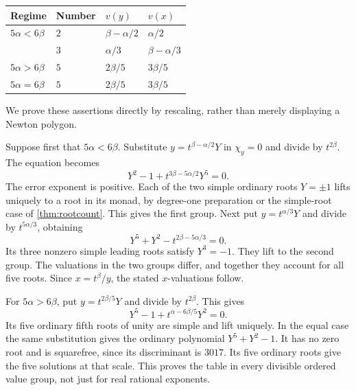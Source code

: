 \documentclass[11pt]{article}
\theoremstyle{definition}
\begin{document}
\begin{center}
\begin{tabular}{@{}L{0.23\textwidth}L{0.12\textwidth}L{0.23\textwidth}L{0.23\textwidth}@{}}
\toprule
Regime & Number & $v(y)$ & $v(x)$\\
\midrule
$5\alpha<6\beta$ & $2$ & $\beta-\alpha/2$ & $\alpha/2$\\[0.3em]
 & $3$ & $\alpha/3$ & $\beta-\alpha/3$\\[0.3em]
$5\alpha>6\beta$ & $5$ & $2\beta/5$ & $3\beta/5$\\[0.3em]
$5\alpha=6\beta$ & $5$ & $2\beta/5$ & $3\beta/5$\\
\bottomrule
\end{tabular}
\end{center}
We prove these assertions directly by rescaling, rather than merely displaying a Newton polygon.

Suppose first that $5\alpha<6\beta$. Substitute $y=t^{\beta-\alpha/2}Y$ in $\chi_y=0$ and divide by $t^{2\beta}$. The equation becomes
\[
 Y^2-1+t^{3\beta-5\alpha/2}Y^5=0.
\]
The error exponent is positive. Each of the two simple ordinary roots $Y=\pm1$ lifts uniquely to a root in its monad, by degree-one preparation or the simple-root case of \cref{thm:rootcount}. This gives the first group. Next put $y=t^{\alpha/3}Y$ and divide by $t^{5\alpha/3}$, obtaining
\[
 Y^5+Y^2-t^{2\beta-5\alpha/3}=0.
\]
Its three nonzero simple leading roots satisfy $Y^3=-1$. They lift to the second group. The valuations in the two groups differ, and together they account for all five roots. Since $x=t^\beta/y$, the stated $x$-valuations follow.

For $5\alpha>6\beta$, put $y=t^{2\beta/5}Y$ and divide by $t^{2\beta}$. This gives
\[
 Y^5-1+t^{\alpha-6\beta/5}Y^2=0.
\]
Its five ordinary fifth roots of unity are simple and lift uniquely. In the equal case the same substitution gives the ordinary polynomial $Y^5+Y^2-1$. It has no zero root and is squarefree, since its discriminant is $3017$. Its five ordinary roots give the five solutions at that scale. This proves the table in every divisible ordered value group, not just for real rational exponents.
\end{document}
